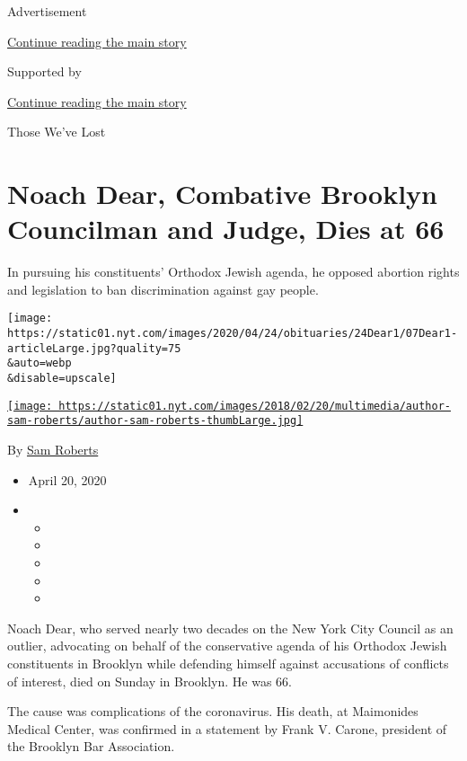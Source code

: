 Advertisement

\protect\hyperlink{after-top}{Continue reading the main story}

Supported by

\protect\hyperlink{after-sponsor}{Continue reading the main story}

Those We've Lost

\hypertarget{noach-dear-combative-brooklyn-councilman-and-judge-dies-at-66}{%
\section{Noach Dear, Combative Brooklyn Councilman and Judge, Dies at
66}\label{noach-dear-combative-brooklyn-councilman-and-judge-dies-at-66}}

In pursuing his constituents' Orthodox Jewish agenda, he opposed
abortion rights and legislation to ban discrimination against gay
people.

\texttt{[image: https://static01.nyt.com/images/2020/04/24/obituaries/24Dear1/07Dear1-articleLarge.jpg?quality=75\\\&auto=webp\\\&disable=upscale]}

\href{https://www.nytimes.com/by/sam-roberts}{\texttt{[image: https://static01.nyt.com/images/2018/02/20/multimedia/author-sam-roberts/author-sam-roberts-thumbLarge.jpg]}}

By \href{https://www.nytimes.com/by/sam-roberts}{Sam Roberts}

\begin{itemize}
\item
  April 20, 2020
\item
  \begin{itemize}
  \item
  \item
  \item
  \item
  \item
  \end{itemize}
\end{itemize}

Noach Dear, who served nearly two decades on the New York City Council
as an outlier, advocating on behalf of the conservative agenda of his
Orthodox Jewish constituents in Brooklyn while defending himself against
accusations of conflicts of interest, died on Sunday in Brooklyn. He was
66.

The cause was complications of the coronavirus. His death, at Maimonides
Medical Center, was confirmed in a statement by Frank V. Carone,
president of the Brooklyn Bar Association.

